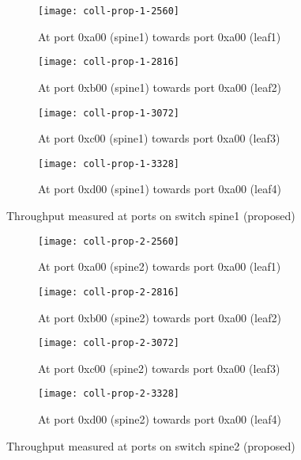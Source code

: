 \begin{figure}[htbp]
    \centering
    \begin{subfigure}[b]{.24\linewidth}
        \texttt{[image: coll-prop-1-2560]}
        \caption{At port 0xa00 (spine1) \newline towards port 0xa00 (leaf1)}%
        \label{fig:spine1-leaf1-prop}
    \end{subfigure}
    \begin{subfigure}[b]{.24\linewidth}
        \texttt{[image: coll-prop-1-2816]}
        \caption{At port 0xb00 (spine1) \newline towards port 0xa00 (leaf2)}%
        \label{fig:spine1-leaf1-prop}
    \end{subfigure}
    \begin{subfigure}[b]{.24\linewidth}
        \texttt{[image: coll-prop-1-3072]}
        \caption{At port 0xc00 (spine1) \newline towards port 0xa00 (leaf3)}%
        \label{fig:spine1-leaf1-prop}
    \end{subfigure}
    \begin{subfigure}[b]{.24\linewidth}
        \texttt{[image: coll-prop-1-3328]}
        \caption{At port 0xd00 (spine1) \newline towards port 0xa00 (leaf4)}%
        \label{fig:spine1-leaf1-prop}
    \end{subfigure}
    \caption{Throughput measured at ports on switch spine1 (proposed)}
    \label{fig:coll-spine1-prop}
    \begin{subfigure}[b]{.24\linewidth}
        \texttt{[image: coll-prop-2-2560]}
        \caption{At port 0xa00 (spine2) \newline towards port 0xa00 (leaf1)}%
        \label{fig:spine1-leaf1-prop}
    \end{subfigure}
    \begin{subfigure}[b]{.24\linewidth}
        \texttt{[image: coll-prop-2-2816]}
        \caption{At port 0xb00 (spine2) \newline towards port 0xa00 (leaf2)}%
        \label{fig:spine1-leaf1-prop}
    \end{subfigure}
    \begin{subfigure}[b]{.24\linewidth}
        \texttt{[image: coll-prop-2-3072]}
        \caption{At port 0xc00 (spine2) \newline towards port 0xa00 (leaf3)}%
        \label{fig:spine1-leaf1-prop}
    \end{subfigure}
    \begin{subfigure}[b]{.24\linewidth}
        \texttt{[image: coll-prop-2-3328]}
        \caption{At port 0xd00 (spine2) \newline towards port 0xa00 (leaf4)}%
        \label{fig:spine1-leaf1-prop}
    \end{subfigure}
    \caption{Throughput measured at ports on switch spine2 (proposed)}
    \label{fig:coll-spine2-prop}
\end{figure}


